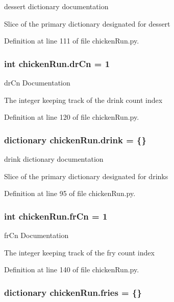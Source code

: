 dessert dictionary documentation 

Slice of the primary dictionary designated for dessert 

Definition at line 111 of file chicken\-Run.\-py.

\hypertarget{namespacechickenRun_a3381811b157d9c729d54e204588ed1f0}{
\subsubsection[{dr\-Cn}]{\setlength{\rightskip}{0pt plus 5cm}int chicken\-Run.\-dr\-Cn = 1}}\label{namespacechickenRun_a3381811b157d9c729d54e204588ed1f0}


dr\-Cn Documentation 

The integer keeping track of the drink count index 

Definition at line 120 of file chicken\-Run.\-py.

\hypertarget{namespacechickenRun_a7f2ba1661cb961b513965e5efb1e77c2}{
\subsubsection[{drink}]{\setlength{\rightskip}{0pt plus 5cm}dictionary chicken\-Run.\-drink = \{\}}}\label{namespacechickenRun_a7f2ba1661cb961b513965e5efb1e77c2}


drink dictionary documentation 

Slice of the primary dictionary designated for drinks 

Definition at line 95 of file chicken\-Run.\-py.

\hypertarget{namespacechickenRun_a5d69c0897bea8a3b81c520b312a47978}{
\subsubsection[{fr\-Cn}]{\setlength{\rightskip}{0pt plus 5cm}int chicken\-Run.\-fr\-Cn = 1}}\label{namespacechickenRun_a5d69c0897bea8a3b81c520b312a47978}


fr\-Cn Documentation 

The integer keeping track of the fry count index 

Definition at line 140 of file chicken\-Run.\-py.

\hypertarget{namespacechickenRun_a0354e54f8d937c814735400f1b57eace}{
\subsubsection[{fries}]{\setlength{\rightskip}{0pt plus 5cm}dictionary chicken\-Run.\-fries = \{\}}}\label{namespacechickenRun_a0354e54f8d937c814735400f1b57eace}


